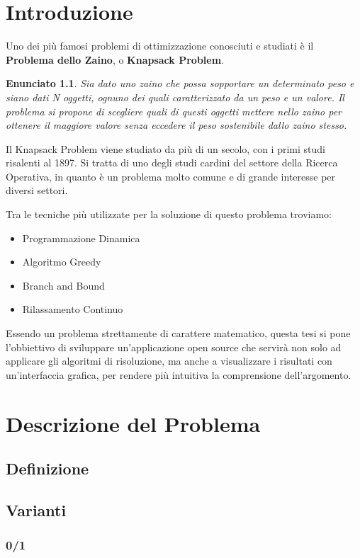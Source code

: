 \documentclass[a4paper,12pt]{report}
\newtheorem{enunciato}{Enunciato}
\begin{document}
\chapter{Introduzione}
Uno dei più famosi problemi di ottimizzazione conosciuti e studiati è il \textbf{Problema dello Zaino}, o \textbf{Knapsack Problem}.
\begin{enunciato}
    Sia dato uno zaino che possa sopportare un determinato peso e siano dati N oggetti, ognuno dei quali caratterizzato da un peso e un valore. Il problema si propone di scegliere quali di questi oggetti mettere nello zaino per ottenere il maggiore valore senza eccedere il peso sostenibile dallo zaino stesso.
\end{enunciato}
Il Knapsack Problem viene studiato da più di un secolo, con i primi studi risalenti al 1897. Si tratta di uno degli studi cardini del settore della Ricerca Operativa, in quanto è un problema molto comune e di grande interesse per diversi settori.
\par
Tra le tecniche più utilizzate per la soluzione di questo problema troviamo:
\begin{itemize}
    \item Programmazione Dinamica
    \item Algoritmo Greedy
    \item Branch and Bound
    \item Rilassamento Continuo
\end{itemize}
\par
Essendo un problema strettamente di carattere matematico, questa tesi si pone l'obbiettivo di sviluppare un'applicazione open source che servirà non solo ad applicare gli algoritmi di risoluzione, ma anche a visualizzare i risultati con un'interfaccia grafica, per rendere più intuitiva la comprensione dell'argomento.
%
\chapter{Descrizione del Problema}
%
\section{Definizione}
%
\section{Varianti}
%
\subsection{0/1}
%
\end{document}
